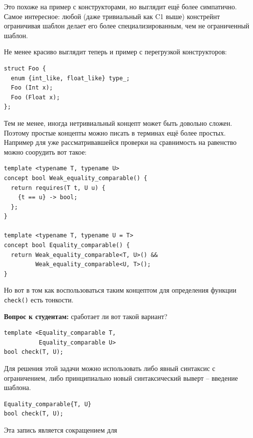 \documentclass[a4paper,12pt,oneside]{article}
\newif\ifanswers
\begin{document}
Это похоже на пример с конструкторами, но выглядит ещё более симпатично. Самое интересное: любой (даже тривиальный как C1 выше) констрейнт ограничивая шаблон делает его более специализированным, чем не ограниченный шаблон.

Не менее красиво выглядит теперь и пример с перегрузкой конструкторов:

\begin{lstlisting}
struct Foo {
  enum {int_like, float_like} type_;
  Foo (Int x);
  Foo (Float x);
};
\end{lstlisting}

Тем не менее, иногда нетривиальный концепт может быть довольно сложен. Поэтому простые концепты можно писать в терминах ещё более простых. Например для уже рассматривавшейся проверки на сравнимость на равенство можно соорудить вот такое:

\begin{lstlisting}
template <typename T, typename U>
concept bool Weak_equality_comparable() {
  return requires(T t, U u) {
    {t == u} -> bool;
  };
}

template <typename T, typename U = T>
concept bool Equality_comparable() {
  return Weak_equality_comparable<T, U>() &&
         Weak_equality_comparable<U, T>();
}
\end{lstlisting}

Но вот в том как воспользоваться таким концептом для определения функции \lstinline!check()! есть тонкости.

\textbf{Вопрос к студентам:} сработает ли вот такой вариант?

\begin{lstlisting}
template <Equality_comparable T,
          Equality_comparable U>
bool check(T, U);
\end{lstlisting}

\ifanswers
Он сработает, но не так как можно ожидать: будет проверено что \lstinline!T! сравнимо с \lstinline!T! и что \lstinline!U! сравнимо с \lstinline!U!. Но программист скорее всего хочет проверить, что \lstinline!T! сравнимо с \lstinline!U!.
\fi

Для решения этой задачи можно использовать либо явный синтаксис с ограничением, либо принципиально новый синтаксический выверт -- введение шаблона.

\begin{lstlisting}
Equality_comparable{T, U}
bool check(T, U);
\end{lstlisting}

Эта запись является сокращением для
\end{document}
